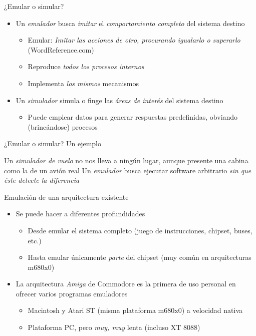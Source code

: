 \documentclass[presentation]{beamer}
\begin{document}
\begin{frame}[label={sec:orgea795ae}]{¿Emular o simular?}
\begin{itemize}
\item Un \emph{emulador} busca \emph{imitar} el \emph{comportamiento completo} del
sistema destino
\begin{itemize}
\item Emular: \emph{Imitar las acciones de otro, procurando igualarlo o
superarlo} (WordReference.com)
\item Reproduce \emph{todos los procesos internos}
\item Implementa \emph{los mismos} mecanismos
\end{itemize}
\item Un \emph{simulador} simula o finge las \emph{áreas de interés} del sistema destino
\begin{itemize}
\item Puede emplear datos para generar respuestas predefinidas, obviando
(brincándose) procesos
\end{itemize}
\end{itemize}
\end{frame}

\begin{frame}[label={sec:orgd37d659}]{¿Emular o simular? Un ejemplo}
\begin{center}
Un \emph{simulador de vuelo} no nos lleva a ningún lugar, aunque presente
una cabina como la de un avión real
\vfill
Un \emph{emulador} busca ejecutar software arbitrario \emph{sin que éste
detecte la diferencia}
\end{center}
\end{frame}

\begin{frame}[label={sec:orgc631a6f}]{Emulación de una arquitectura existente}
\begin{itemize}
\item Se puede hacer a diferentes profundidades
\begin{itemize}
\item Desde emular el sistema completo (juego de instrucciones, chipset,
buses, etc.)
\item Hasta emular únicamente \emph{parte} del chipset (muy común en
arquitecturas m680x0)
\end{itemize}
\item La arquitectura \emph{Amiga} de Commodore es la primera de uso personal
en ofrecer varios programas emuladores
\begin{itemize}
\item Macintosh y Atari ST (misma plataforma m680x0) a velocidad nativa
\item Plataforma PC, pero \emph{muy, muy} lenta (incluso XT 8088)
\end{itemize}
\end{itemize}
\end{frame}
\end{document}
